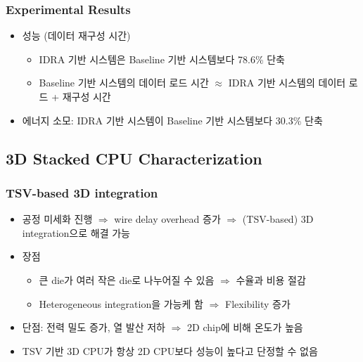 \subsubsection*{Experimental Results}
\begin{itemize}
    \item 성능 (데이터 재구성 시간)
    \begin{itemize}
        \item IDRA 기반 시스템은 Baseline 기반 시스템보다 78.6\% 단축
        \item Baseline 기반 시스템의 데이터 로드 시간 $\approx$ IDRA 기반 시스템의 데이터 로드 + 재구성 시간
    \end{itemize}
    \item 에너지 소모: IDRA 기반 시스템이 Baseline 기반 시스템보다 30.3\% 단축
\end{itemize}

\subsection{3D Stacked CPU Characterization}

\subsubsection*{TSV-based 3D integration}
\begin{itemize}
    \item 공정 미세화 진행 $\Rightarrow$ wire delay overhead 증가 $\Rightarrow$ (TSV-based) 3D integration으로 해결 가능
    \item 장점
    \begin{itemize}
        \item 큰 die가 여러 작은 die로 나누어질 수 있음 $\Rightarrow$ 수율과 비용 절감
        \item Heterogeneous integration을 가능케 함 $\Rightarrow$ Flexibility 증가
    \end{itemize}
    \item 단점: 전력 밀도 증가, 열 발산 저하 $\Rightarrow$ 2D chip에 비해 온도가 높음
    \item TSV 기반 3D CPU가 항상 2D CPU보다 성능이 높다고 단정할 수 없음
\end{itemize}

